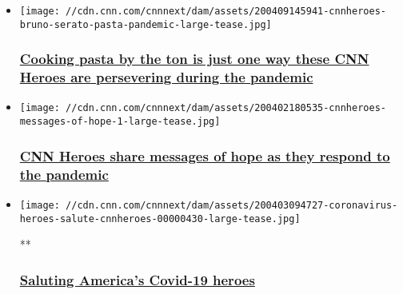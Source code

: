\begin{itemize}
\item
  \href{/2020/04/09/us/coronavirus-cnnheroes-food-donations-sober-workouts/index.html}{}

  \texttt{[image: //cdn.cnn.com/cnnnext/dam/assets/200409145941-cnnheroes-bruno-serato-pasta-pandemic-large-tease.jpg]}

  \hypertarget{cooking-pasta-by-the-ton-is-just-one-way-these-cnn-heroes-are-persevering-during-the-pandemic}{%
  \subsubsection{\texorpdfstring{\href{/2020/04/09/us/coronavirus-cnnheroes-food-donations-sober-workouts/index.html}{Cooking
  pasta by the ton is just one way these CNN Heroes are persevering
  during the
  pandemic}}{Cooking pasta by the ton is just one way these CNN Heroes are persevering during the pandemic}}\label{cooking-pasta-by-the-ton-is-just-one-way-these-cnn-heroes-are-persevering-during-the-pandemic}}
\end{itemize}

\begin{itemize}
\item
  \href{/2020/04/02/us/coronavirus-cnnheroes-messages-of-hope/index.html}{}

  \texttt{[image: //cdn.cnn.com/cnnnext/dam/assets/200402180535-cnnheroes-messages-of-hope-1-large-tease.jpg]}

  \hypertarget{cnn-heroes-share-messages-of-hope-as-they-respond-to-the-pandemic}{%
  \subsubsection{\texorpdfstring{\href{/2020/04/02/us/coronavirus-cnnheroes-messages-of-hope/index.html}{CNN
  Heroes share messages of hope as they respond to the
  pandemic}}{CNN Heroes share messages of hope as they respond to the pandemic}}\label{cnn-heroes-share-messages-of-hope-as-they-respond-to-the-pandemic}}
\end{itemize}

\begin{itemize}
\item
  \href{/videos/tv/2020/04/03/coronavirus-heroes-salute-cnnheroes.cnn}{}

  \texttt{[image: //cdn.cnn.com/cnnnext/dam/assets/200403094727-coronavirus-heroes-salute-cnnheroes-00000430-large-tease.jpg]}

  **

  \hypertarget{saluting-americas-covid-19-heroes}{%
  \subsubsection{\texorpdfstring{\href{/videos/tv/2020/04/03/coronavirus-heroes-salute-cnnheroes.cnn}{Saluting
  America's Covid-19
  heroes}}{Saluting America's Covid-19 heroes}}\label{saluting-americas-covid-19-heroes}}
\end{itemize}

